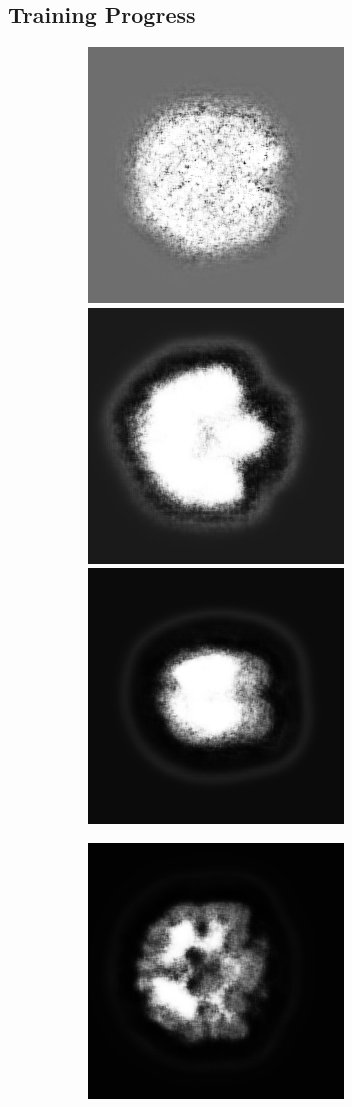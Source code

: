 \documentclass[12pt, fleqn, titlepage]{article}
\newcommand\skipper{1.4pt}
\newcommand\ripper{2.5pt}
\begin{document}
\subsection{Training Progress}\label{training_progress}
\begin{figure}[H]
	\centering
	\begin{subfigure}[b]{0.7\textwidth}
		\centering
		\includegraphics[width=0.32\linewidth]{imgs/placeholder_idx_0}
		\hskip\skipper
		\includegraphics[width=0.32\linewidth]{imgs/placeholder_idx_4000}
		\hskip\skipper
		\includegraphics[width=0.32\linewidth]{imgs/placeholder_idx_10000}
	\end{subfigure}
	\vskip\ripper
	\begin{subfigure}[b]{0.7\textwidth}
		\centering
		\includegraphics[width=0.32\linewidth]{imgs/placeholder_idx_14000}

\end{subfigure}
\end{figure}
\end{document}
